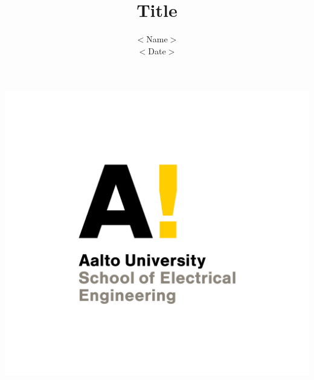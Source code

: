 \documentclass[11pt,aspectratio=169]{beamer}
\begin{document}
	
\subtitle{}
\title{Title}

\author[]{$<$Name$>$\\ \vspace{.5em}$<$Date$>$}
\date{}
\begin{frame}
\includegraphics[scale=.45]{Aalto_ELEC_y.png}\vspace{-.5Em}
\titlepage
\vspace{-3Em}
\end{frame}
\end{document}
